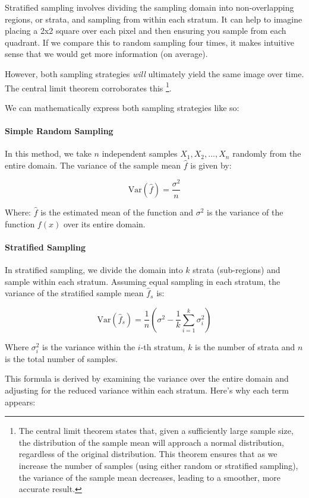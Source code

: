 \documentclass[12pt]{article}
\begin{document}
Stratified sampling involves dividing the sampling domain into non-overlapping regions, or strata, and sampling from within each stratum. It can help to imagine placing a 2x2 square over each pixel and then ensuring you sample from each quadrant. If we compare this to random sampling four times, it makes intuitive sense that we would get more information (on average).

However, both sampling strategies \textit{will} ultimately yield the same image over time. The central limit theorem corroborates this \footnote{The central limit theorem states that, given a sufficiently large sample size, the distribution of the sample mean will approach a normal distribution, regardless of the original distribution. This theorem ensures that as we increase the number of samples (using either random or stratified sampling), the variance of the sample mean decreases, leading to a smoother, more accurate result.}.

We can mathematically express both sampling strategies like so:



\paragraph{Simple Random Sampling} In this method, we take $n$ independent samples $X_1, X_2, ..., X_n$ randomly from the entire domain. The variance of the sample mean $\hat{f}$ is given by:

\[
    \text{Var}(\hat{f}) = \frac{\sigma^2}{n}
\]

Where:
$\hat{f}$ is the estimated mean of the function and $\sigma^2$ is the variance of the function $f(x)$ over its entire domain.

\paragraph{Stratified Sampling} In stratified sampling, we divide the domain into $k$ strata (sub-regions) and sample within each stratum. Assuming equal sampling in each stratum, the variance of the stratified sample mean $\hat{f}_s$ is:

\[
    \text{Var}(\hat{f}_s) = \frac{1}{n} \left( \sigma^2 - \frac{1}{k} \sum_{i=1}^k \sigma_i^2 \right)
\]

Where $\sigma_i^2$ is the variance within the $i$-th stratum, $k$ is the number of strata and $n$ is the total number of samples.

This formula is derived by examining the variance over the entire domain and adjusting for the reduced variance within each stratum. Here’s why each term appears:
\end{document}
